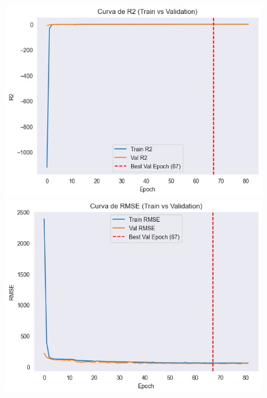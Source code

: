 \begin{figure}[H]
\begin{minipage}{0.48\textwidth}
		\includegraphics[width=\linewidth]{includes/cap5/graphs/sid1_mlp_r2.png}
		\vspace{0.2cm}
		\includegraphics[width=\linewidth]{includes/cap5/graphs/sid1_mlp_rmse.png}
	\end{minipage}
	\label{fig:curvas_sid1_mlp}
\end{figure}

